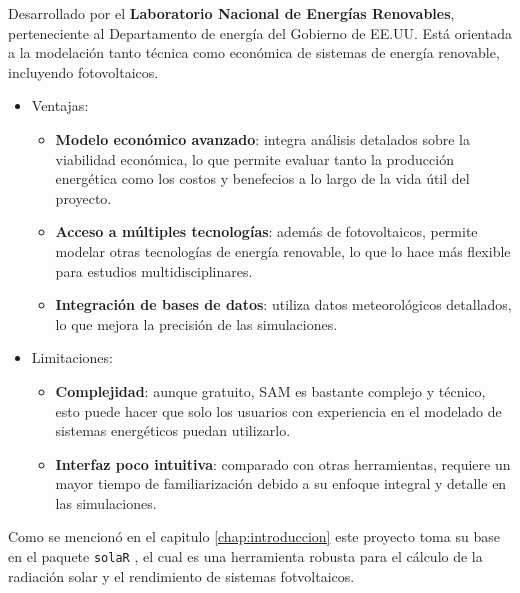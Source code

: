 \begin{enumerate}
Desarrollado por el \textbf{Laboratorio Nacional de Energías Renovables}, perteneciente al Departamento de energía del Gobierno de EE.UU. Está orientada a la modelación tanto técnica como económica de sistemas de energía renovable, incluyendo fotovoltaicos.
\begin{itemize}
\item Ventajas:
\begin{itemize}
\item \textbf{Modelo económico avanzado}: integra análisis detalados sobre la viabilidad económica, lo que permite evaluar tanto la producción energética como los costos y benefecios a lo largo de la vida útil del proyecto.
\item \textbf{Acceso a múltiples tecnologías}: además de fotovoltaicos, permite modelar otras tecnologías de energía renovable, lo que lo hace más flexible para estudios multidisciplinares.
\item \textbf{Integración de bases de datos}: utiliza datos meteorológicos detallados, lo que mejora la precisión de las simulaciones.
\end{itemize}
\item Limitaciones:
\begin{itemize}
\item \textbf{Complejidad}: aunque gratuito, SAM es bastante complejo y técnico, esto puede hacer que solo los usuarios con experiencia en el modelado de sistemas energéticos puedan utilizarlo.
\item \textbf{Interfaz poco intuitiva}: comparado con otras herramientas, requiere un mayor tiempo de familiarización debido a su enfoque integral y detalle en las simulaciones.
\end{itemize}
\end{itemize}
\end{enumerate}

Como se mencionó en el capitulo \ref{chap:introduccion} este proyecto toma su base en el paquete \texttt{solaR} \cite{perpinan12}, el cual es una herramienta robusta para el cálculo de la radiación solar y el rendimiento de sistemas fotvoltaicos.

